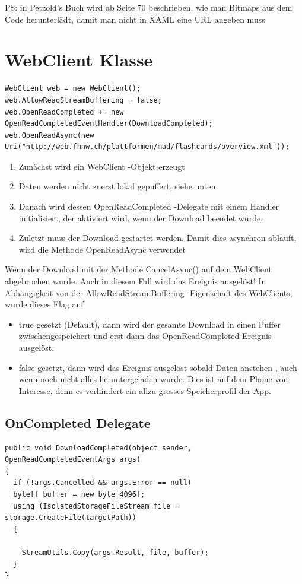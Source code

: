 \documentclass[a4paper,10pt]{scrreprt}
\begin{document}
PS: in Petzold’s Buch wird ab Seite 70 beschrieben, wie man Bitmaps aus dem Code herunterlädt, damit man
nicht in XAML eine URL angeben muss

\section{WebClient Klasse}
\begin{lstlisting}[caption=Webclient]
 WebClient web = new WebClient();
web.AllowReadStreamBuffering = false;
web.OpenReadCompleted += new OpenReadCompletedEventHandler(DownloadCompleted);
web.OpenReadAsync(new Uri("http://web.fhnw.ch/plattformen/mad/flashcards/overview.xml"));
\end{lstlisting}
\begin{enumerate}
\item Zunächst wird ein WebClient -Objekt erzeugt
\item  Daten werden nicht zuerst lokal gepuffert, siehe unten.
\item Danach wird dessen OpenReadCompleted -Delegate mit einem Handler initialisiert, der aktiviert wird,
wenn der Download beendet wurde.
\item Zuletzt muss der Download gestartet werden. Damit dies asynchron abläuft, wird die Methode
OpenReadAsync verwendet
\end{enumerate}

\begin{framed}
 Wenn der Download mit der Methode CancelAsync() auf dem WebClient abgebrochen wurde. Auch in
diesem Fall wird das Ereignis ausgelöst!
In Abhängigkeit von der AllowReadStreamBuffering -Eigenschaft des WebClients; wurde dieses Flag auf
\begin{itemize}


 \item  true gesetzt (Default), dann wird der gesamte Download in einen Puffer zwischengespeichert
und erst dann das OpenReadCompleted-Ereignis ausgelöst.
 \item  false gesetzt, dann wird das Ereignis ausgelöst sobald Daten anstehen , auch wenn noch nicht
alles heruntergeladen wurde. Dies ist auf dem Phone von Interesse, denn es verhindert ein allzu
grosses Speicherprofil der App.

\end{itemize}
\end{framed}

\subsection{OnCompleted Delegate}
\begin{lstlisting}[caption=OnCompleted Webclient (Stream Copy)]
 public void DownloadCompleted(object sender, OpenReadCompletedEventArgs args)
{
  if (!args.Cancelled && args.Error == null)
  byte[] buffer = new byte[4096];
  using (IsolatedStorageFileStream file = storage.CreateFile(targetPath))
  {

    StreamUtils.Copy(args.Result, file, buffer);
  }
}
\end{lstlisting}
\end{document}
